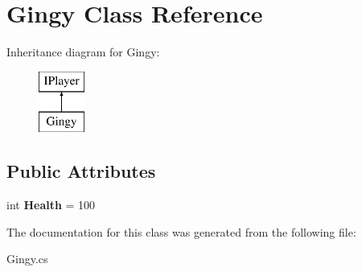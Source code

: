 \hypertarget{class_gingy}{}\section{Gingy Class Reference}
\label{class_gingy}
Inheritance diagram for Gingy\+:\begin{figure}[H]
\begin{center}
\leavevmode
\includegraphics[height=2.000000cm]{class_gingy}
\end{center}
\end{figure}
\subsection*{Public Attributes}
\begin{DoxyCompactItemize}
\item 
\mbox{\label{class_gingy_a1f2c2d5434afa46ac7c79e4a6eaa4fd5}} 
int {\bfseries Health} = 100
\end{DoxyCompactItemize}


The documentation for this class was generated from the following file\+:\begin{DoxyCompactItemize}
\item 
Gingy.\+cs\end{DoxyCompactItemize}
